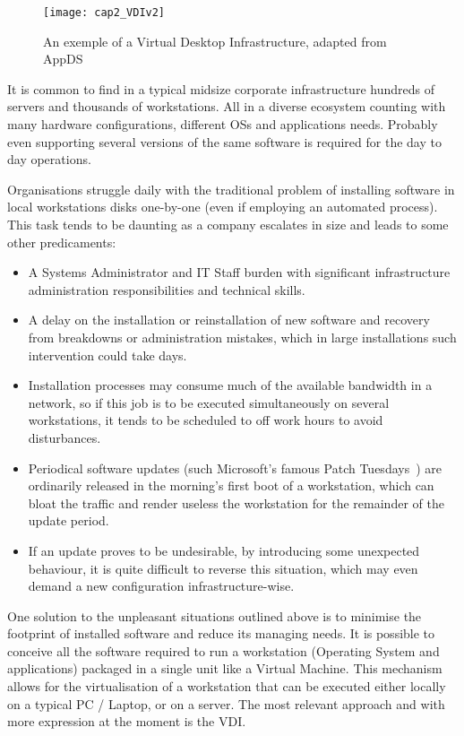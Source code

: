 \begin{figure}[htbp]
	\centering
	\texttt{[image: cap2\_VDIv2]}
	\caption{An exemple of a Virtual Desktop Infrastructure, adapted from AppDS~\cite{appds_2017}}
	\label{fig:VDI}
\end{figure}

It is common to find in a typical midsize corporate infrastructure hundreds of servers and thousands of workstations. All in a diverse ecosystem counting with many hardware configurations, different OSs and applications needs. Probably even supporting several versions of the same software is required for the day to day operations.

Organisations struggle daily with the traditional problem of installing software in local workstations disks one-by-one (even if employing an automated process). This task tends to be daunting as a company escalates in size and leads to some other predicaments:

\begin{itemize}
	\item A Systems Administrator and IT Staff burden with significant infrastructure administration responsibilities and technical skills.
	\item A delay on the installation or reinstallation of new software and recovery from breakdowns or administration mistakes, which in large installations such intervention could take days.
	\item Installation processes may consume much of the available bandwidth in a network, so if this job is to be executed simultaneously on several workstations, it tends to be scheduled to off work hours to avoid disturbances.
	\item Periodical software updates (such Microsoft's famous Patch Tuesdays~\cite{patch_2017}) are ordinarily released in the morning's first boot of a workstation, which can bloat the traffic and render useless the workstation for the remainder of the update period.
	\item If an update proves to be undesirable, by introducing some unexpected behaviour, it is quite difficult to reverse this situation, which may even demand a new configuration infrastructure-wise.
\end{itemize}

One solution to the unpleasant situations outlined above is to minimise the footprint of installed software and reduce its managing needs. It is possible to conceive all the software required to run a workstation (Operating System and applications) packaged in a single unit like a Virtual Machine. This mechanism allows for the virtualisation of a workstation that can be executed either locally on a typical PC / Laptop, or on a server. The most relevant approach and with more expression at the moment is the \gls{VDI}.

